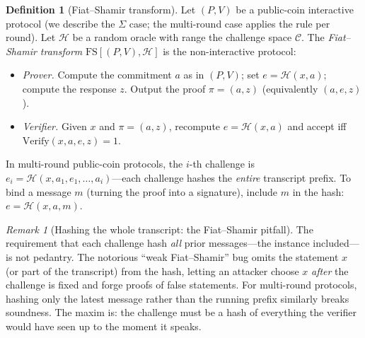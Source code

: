 \documentclass[11pt,a4paper]{article}
\theoremstyle{definition}
\newtheorem{definition}[theorem]{Definition}
\theoremstyle{remark}
\newtheorem{remark}[theorem]{Remark}
\begin{document}
\begin{definition}[Fiat--Shamir transform]\label{zk:def:fs}
Let \((P, V)\) be a public-coin interactive protocol (we describe the \(\Sigma\) case; the multi-round case applies the rule per round). Let \(\mathcal{H}\) be a random oracle with range the challenge space \(\mathcal{C}\). The \emph{Fiat--Shamir transform} \(\mathrm{FS}[(P,V), \mathcal{H}]\) is the non-interactive protocol:
\begin{itemize}
  \item \emph{Prover.} Compute the commitment \(a\) as in \((P,V)\); set \(e = \mathcal{H}(x, a)\); compute the response \(z\). Output the proof \(\pi = (a, z)\) (equivalently \((a,e,z)\)).
  \item \emph{Verifier.} Given \(x\) and \(\pi = (a,z)\), recompute \(e = \mathcal{H}(x, a)\) and accept iff \(\mathrm{Verify}(x, a, e, z) = 1\).
\end{itemize}
In multi-round public-coin protocols, the \(i\)-th challenge is \(e_i = \mathcal{H}(x, a_1, e_1, \dots, a_{i})\)---each challenge hashes the \emph{entire} transcript prefix. To bind a message \(m\) (turning the proof into a signature), include \(m\) in the hash: \(e = \mathcal{H}(x, a, m)\).
\end{definition}

\begin{remark}[Hashing the whole transcript: the Fiat--Shamir pitfall]\label{zk:rem:fspitfall}
The requirement that each challenge hash \emph{all} prior messages---the instance included---is not pedantry. The notorious ``weak Fiat--Shamir'' bug omits the statement \(x\) (or part of the transcript) from the hash, letting an attacker choose \(x\) \emph{after} the challenge is fixed and forge proofs of false statements. For multi-round protocols, hashing only the latest message rather than the running prefix similarly breaks soundness. The maxim is: the challenge must be a hash of everything the verifier would have seen up to the moment it speaks.
\end{remark}
\end{document}
